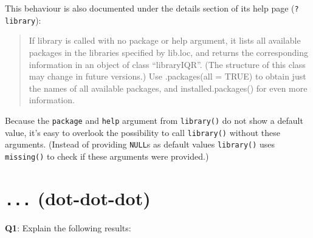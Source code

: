 \documentclass[
]{krantz}
\makeatletter
\newenvironment{Shaded}{\begin{snugshade}}{\end{snugshade}}
\newcommand{\CommentTok}[1]{\textcolor[rgb]{0.56,0.35,0.01}{\textit{#1}}}
\newcommand{\KeywordTok}[1]{\textcolor[rgb]{0.13,0.29,0.53}{\textbf{#1}}}
\newcommand{\NormalTok}[1]{#1}
\newenvironment{kframe}{%
\medskip{}
\setlength{\fboxsep}{.8em}
 \def\at@end@of@kframe{}%
 \ifinner\ifhmode%
  \def\at@end@of@kframe{\end{minipage}}%
  \begin{minipage}{\columnwidth}%
 \fi\fi%
 \def\FrameCommand##1{\hskip\@totalleftmargin \hskip-\fboxsep
 \colorbox{shadecolor}{##1}\hskip-\fboxsep
     \hskip-\linewidth \hskip-\@totalleftmargin \hskip\columnwidth}%
 \MakeFramed {\advance\hsize-\width
   \@totalleftmargin\z@ \linewidth\hsize
   \@setminipage}}%
 {\par\unskip\endMakeFramed%
 \at@end@of@kframe}
\renewenvironment{Shaded}{\begin{kframe}}{\end{kframe}}
\renewcommand{\KeywordTok} [1]{\textcolor[rgb]{0.00,0.44,0.13}{{#1}}}
\renewcommand{\CommentTok} [1]{\textcolor[rgb]{0.38,0.63,0.69}{{#1}}}
\renewcommand{\NormalTok}  [1]{{#1}}
\makeatother
\begin{document}
This behaviour is also documented under the details section of its help page (\texttt{?library}):

\begin{quote}
If library is called with no package or help argument, it lists all available packages in the libraries specified by lib.loc, and returns the corresponding information in an object of class ``libraryIQR''. (The structure of this class may change in future versions.) Use .packages(all = TRUE) to obtain just the names of all available packages, and installed.packages() for even more information.
\end{quote}

Because the \texttt{package} and \texttt{help} argument from \texttt{library()} do not show a default value, it's easy to overlook the possibility to call \texttt{library()} without these arguments. (Instead of providing \texttt{NULL}s as default values \texttt{library()} uses \texttt{missing()} to check if these arguments were provided.)

\begin{Shaded}
\end{Shaded}

\hypertarget{dot-dot-dot}{%
\section{\texorpdfstring{\texttt{...} (dot-dot-dot)}{... (dot-dot-dot)}}\label{dot-dot-dot}}

\textbf{{Q1}}: Explain the following results:
\end{document}
